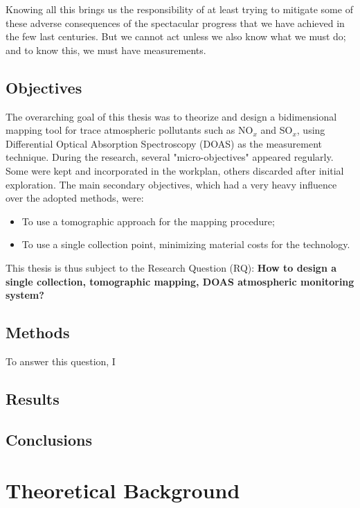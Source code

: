 Knowing all this brings us the responsibility of at least trying to
mitigate some of these adverse consequences of the spectacular progress
that we have achieved in the few last centuries. But we cannot act
unless we also know what we must do; and to know this, we must have
measurements.

\subsection{Objectives}%
\label{sub:objectives}

The overarching goal of this thesis was to theorize and design a
bidimensional mapping tool for trace atmospheric pollutants such as
NO$_x$ and SO$_x$, using Differential Optical Absorption Spectroscopy
(\gls{DOAS}) as the measurement technique. During the research, several
"micro-objectives" appeared regularly. Some were kept and incorporated
in the workplan, others discarded after initial exploration. The main
secondary objectives, which had a very heavy influence over the adopted
methods, were:
\begin{itemize}
    \item To use a tomographic approach for the mapping procedure;
    \item To use a single collection point, minimizing material costs
        for the technology.
\end{itemize}

This thesis is thus subject to the Research Question (\gls{RQ}):
\textbf{How to design a single collection, tomographic mapping, DOAS
atmospheric monitoring system?}

\subsection{Methods}%
\label{sub:methods}

To answer this question, I 

\subsection{Results}%
\label{sub:results}

\subsection{Conclusions}%
\label{sub:conclusions}

\section{Theoretical Background}%
\label{sec:theoretical_background}

